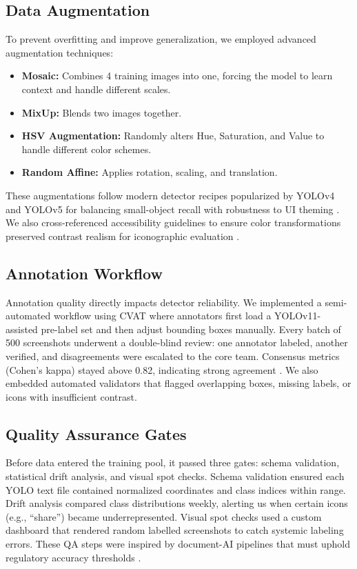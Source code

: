\documentclass[11pt,a4paper]{report}
\begin{document}
\subsection{Data Augmentation}
To prevent overfitting and improve generalization, we employed advanced augmentation techniques:
\begin{itemize}
    \item \textbf{Mosaic:} Combines 4 training images into one, forcing the model to learn context and handle different scales.
    \item \textbf{MixUp:} Blends two images together.
    \item \textbf{HSV Augmentation:} Randomly alters Hue, Saturation, and Value to handle different color schemes.
    \item \textbf{Random Affine:} Applies rotation, scaling, and translation.
\end{itemize}
These augmentations follow modern detector recipes popularized by YOLOv4 and YOLOv5 for balancing small-object recall with robustness to UI theming \cite{yolov4}\cite{yolov5}. We also cross-referenced accessibility guidelines to ensure color transformations preserved contrast realism for iconographic evaluation \cite{multimodalaccessibility}.

\subsection{Annotation Workflow}
Annotation quality directly impacts detector reliability. We implemented a semi-automated workflow using CVAT where annotators first load a YOLOv11-assisted pre-label set and then adjust bounding boxes manually. Every batch of 500 screenshots underwent a double-blind review: one annotator labeled, another verified, and disagreements were escalated to the core team. Consensus metrics (Cohen's kappa) stayed above 0.82, indicating strong agreement \cite{rico}. We also embedded automated validators that flagged overlapping boxes, missing labels, or icons with insufficient contrast.

\subsection{Quality Assurance Gates}
Before data entered the training pool, it passed three gates: schema validation, statistical drift analysis, and visual spot checks. Schema validation ensured each YOLO text file contained normalized coordinates and class indices within range. Drift analysis compared class distributions weekly, alerting us when certain icons (e.g., ``share'') became underrepresented. Visual spot checks used a custom dashboard that rendered random labelled screenshots to catch systemic labeling errors. These QA steps were inspired by document-AI pipelines that must uphold regulatory accuracy thresholds \cite{omniparser}.
\end{document}
